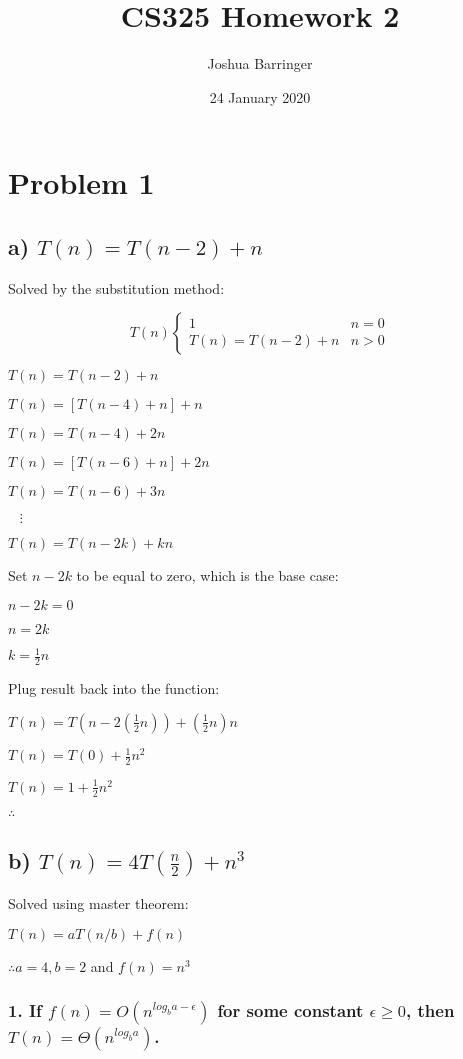 \documentclass{article}
\title{CS325 Homework 2}
\author{Joshua Barringer}
\date{24 January 2020}
\begin{document}
\maketitle

\section*{Problem 1}

\subsection*{a) $T(n) = T(n - 2) + n$}

Solved by the substitution method:

\[
    T(n)
    \begin{cases} 
      1 & n = 0 \\
      T(n) = T(n - 2) + n & n > 0
   \end{cases}
\]

$T(n) = T(n - 2) + n$

$T(n) = [T(n - 4) + n] + n$

$T(n) = T(n - 4) + 2n$

$T(n) = [T(n - 6) + n] + 2n$

$T(n) = T(n - 6) + 3n$

$\;\;\;\vdots$

$T(n) = T(n - 2k) + kn$

Set $n - 2k$ to be equal to zero, which is the base case:

$n - 2k = 0$

$n = 2k$

$k = \frac{1}{2}n$

Plug result back into the function:

$T(n) = T(n - 2(\frac{1}{2}n)) + (\frac{1}{2}n)n$

$T(n) = T(0) + \frac{1}{2}n^2$

$T(n) = 1 + \frac{1}{2}n^2$

$\therefore$  

\subsection*{b) $T(n) = 4T(\frac{n}{2}) + n^3$}

Solved using master theorem:

$T(n) = aT(n/b) + f(n)$

$\therefore a = 4, b = 2$ and $f(n) = n^3$

\subsubsection*{1. If $f(n) = O(n^{log_ba - \epsilon})$ for some constant $\epsilon \geq  0$, then $T(n) = \Theta(n^{log_ba})$.}
\end{document}
